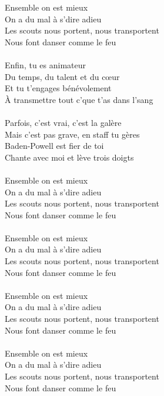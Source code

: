 Ensemble on est mieux\\
On a du mal à s'dire adieu\\
Les scouts nous portent, nous transportent\\
Nous font danser comme le feu\\\\
Enfin, tu es animateur\\
Du temps, du talent et du cœur\\
Et tu t'engages bénévolement\\
À transmettre tout c'que t'as dans l'sang\\\\
Parfois, c'est vrai, c'est la galère\\
Mais c'est pas grave, en staff tu gères\\
Baden-Powell est fier de toi\\
Chante avec moi et lève trois doigts\\\\
Ensemble on est mieux\\
On a du mal à s'dire adieu\\
Les scouts nous portent, nous transportent\\
Nous font danser comme le feu\\\\
Ensemble on est mieux\\
On a du mal à s'dire adieu\\
Les scouts nous portent, nous transportent\\
Nous font danser comme le feu\\\\
Ensemble on est mieux\\
On a du mal à s'dire adieu\\
Les scouts nous portent, nous transportent\\
Nous font danser comme le feu\\\\
Ensemble on est mieux\\
On a du mal à s'dire adieu\\
Les scouts nous portent, nous transportent\\
Nous font danser comme le feu\\
